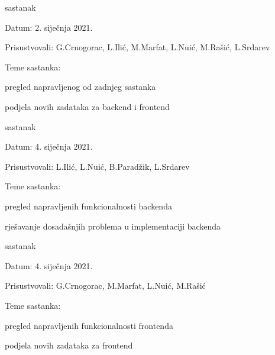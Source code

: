 \begin{packed_enum}
			\item  sastanak
			\item[] \begin{packed_item}
				\item Datum: 2. siječnja 2021.
				\item Prisustvovali:  G.Crnogorac, L.Ilić, M.Marfat, L.Nuić, M.Rašić, L.Srdarev 
				\item Teme sastanka:
				\begin{packed_item}
					\item  pregled napravljenog od zadnjeg sastanka 
					\item  podjela novih zadataka za backend i frontend
				\end{packed_item}
			\end{packed_item}
		
			\item  sastanak
			\item[] \begin{packed_item}
				\item Datum: 4. siječnja 2021.
				\item Prisustvovali: L.Ilić, L.Nuić, B.Paradžik, L.Srdarev
				\item Teme sastanka:
				\begin{packed_item}
					\item  pregled napravljenih funkcionalnosti backenda 
					\item  rješavanje dosadašnjih problema u implementaciji backenda
				\end{packed_item}
			\end{packed_item}
		
			\item  sastanak
			\item[] \begin{packed_item}
				\item Datum: 4. siječnja 2021.
				\item Prisustvovali: G.Crnogorac,  M.Marfat, L.Nuić, M.Rašić
				\item Teme sastanka:
				\begin{packed_item}
					\item  pregled napravljenih funkcionalnosti frontenda 
					\item  podjela novih zadataka za frontend
				\end{packed_item}
			\end{packed_item}
		

\end{packed_enum}

